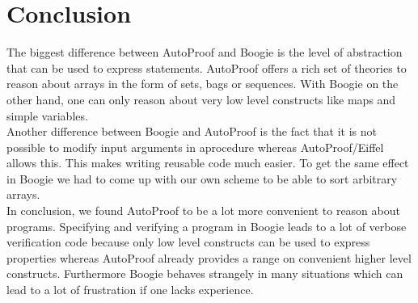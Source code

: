 \section{Conclusion}
\label{sec:conclusion}
The biggest difference between AutoProof and Boogie is the level of abstraction that can be 
used to express statements. AutoProof offers a rich set of theories to reason about arrays in the
form of sets, bags or sequences. With Boogie on the other hand, one can only reason about very 
low level constructs like maps and simple variables.\\

Another difference between Boogie and AutoProof is the fact that it is not possible to modify
input arguments in aprocedure whereas AutoProof/Eiffel allows this. This makes writing reusable code
much easier. To get the same effect in Boogie we had to come up with our own scheme to be able to sort arbitrary arrays.\\

In conclusion, we found AutoProof to be a lot more convenient to reason about programs. Specifying and
verifying a program in Boogie leads to a lot of verbose verification code because only low level constructs 
can be used to express properties whereas AutoProof already provides a range on convenient higher level constructs. 
Furthermore Boogie behaves strangely in many situations which can lead to a lot of frustration if one lacks experience.
